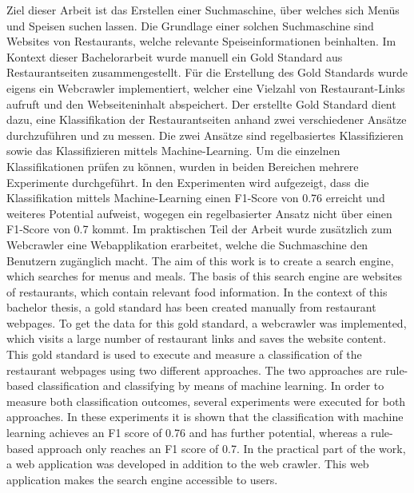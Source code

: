 Ziel dieser Arbeit ist das Erstellen einer Suchmaschine, über welches sich Menüs und Speisen suchen lassen.
Die Grundlage einer solchen Suchmaschine sind Websites von Restaurants, welche relevante Speiseinformationen beinhalten.
Im Kontext dieser Bachelorarbeit wurde manuell ein Gold Standard aus Restaurantseiten zusammengestellt.
Für die Erstellung des Gold Standards wurde eigens ein Webcrawler implementiert, welcher eine Vielzahl von Restaurant-Links aufruft und den Webseiteninhalt abspeichert.
Der erstellte Gold Standard dient dazu, eine Klassifikation der Restaurantseiten anhand zwei verschiedener Ansätze durchzuführen und zu messen.
Die zwei Ansätze sind regelbasiertes Klassifizieren sowie das Klassifizieren mittels Machine-Learning.
Um die einzelnen Klassifikationen prüfen zu können, wurden in beiden Bereichen mehrere Experimente durchgeführt.
In den Experimenten wird aufgezeigt, dass die Klassifikation mittels Machine-Learning einen F1-Score von 0.76 erreicht und weiteres Potential aufweist, wogegen ein regelbasierter Ansatz nicht über einen F1-Score von 0.7 kommt.
Im praktischen Teil der Arbeit wurde zusätzlich zum Webcrawler eine Webapplikation erarbeitet, welche die Suchmaschine den Benutzern zugänglich macht.
The aim of this work is to create a search engine, which searches for menus and meals.
The basis of this search engine are websites of restaurants, which contain relevant food information.
In the context of this bachelor thesis, a gold standard has been created manually from restaurant webpages.
To get the data for this gold standard, a webcrawler was implemented, which visits a large number of restaurant links and saves the website content.
This gold standard is used to execute and measure a classification of the restaurant webpages using two different approaches.
The two approaches are rule-based classification and classifying by means of machine learning.
In order to measure both classification outcomes, several experiments were executed for both approaches.
In these experiments it is shown that the classification with machine learning achieves an F1 score of 0.76 and has further potential, whereas a rule-based approach only reaches an F1 score of 0.7.
In the practical part of the work, a web application was developed in addition to the web crawler.
This web application makes the search engine accessible to users.
